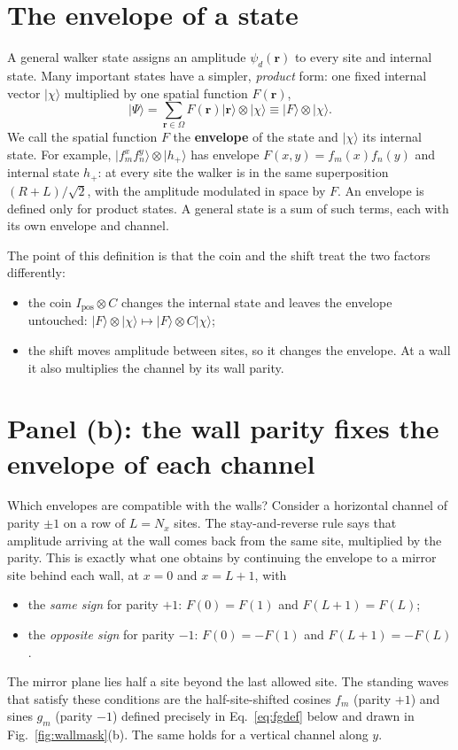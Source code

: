 \documentclass[11pt,a4paper,oneside]{report}
\newcommand{\ket}[1]{\lvert #1\rangle}
\newcommand{\Id}{I}
\numberwithin{equation}{chapter}
\begin{document}
\section{The envelope of a state}
\label{sec:envelopedef}

A general walker state assigns an amplitude \(\psi_d(\mathbf r)\) to every
site and internal state. Many important states have a simpler,
\emph{product} form: one fixed internal vector \(\ket\chi\) multiplied
by one spatial function \(F(\mathbf r)\),
\begin{equation}
\ket\Psi=\sum_{\mathbf r\in\Omega}F(\mathbf r)\ket{\mathbf r}\otimes
\ket\chi\equiv\ket F\otimes\ket\chi .
\end{equation}
We call the spatial function \(F\) the \textbf{envelope} of the state and
\(\ket\chi\) its internal state. For example,
\(\ket{f_m^xf_n^y}\otimes\ket{h_+}\) has envelope
\(F(x,y)=f_m(x)f_n(y)\) and internal state \(h_+\): at every site the
walker is in the same superposition \((R+L)/\sqrt2\), with the amplitude
modulated in space by \(F\). An envelope is defined only for product
states. A general state is a sum of such terms, each with its own
envelope and channel.

The point of this definition is that the coin and the shift treat the two
factors differently:
\begin{itemize}
\item the coin \(\Id_{\mathrm{pos}}\otimes C\) changes the internal state
and leaves the envelope untouched:
\(\ket F\otimes\ket\chi\mapsto\ket F\otimes C\ket\chi\);
\item the shift moves amplitude between sites, so it changes the
envelope. At a wall it also multiplies the channel by its wall parity.
\end{itemize}

\section{Panel (b): the wall parity fixes the envelope of each channel}
\label{sec:panelb}

Which envelopes are compatible with the walls? Consider a horizontal
channel of parity \(\pm1\) on a row of \(L=N_x\) sites. The
stay-and-reverse rule says that amplitude arriving at the wall comes back
from the same site, multiplied by the parity. This is exactly what one
obtains by continuing the envelope to a mirror site behind each wall, at
\(x=0\) and \(x=L+1\), with
\begin{itemize}
\item the \emph{same sign} for parity \(+1\): \(F(0)=F(1)\) and
\(F(L+1)=F(L)\);
\item the \emph{opposite sign} for parity \(-1\): \(F(0)=-F(1)\) and
\(F(L+1)=-F(L)\).
\end{itemize}
The mirror plane lies half a site beyond the last allowed site. The
standing waves that satisfy these conditions are the half-site-shifted
cosines \(f_m\) (parity \(+1\)) and sines \(g_m\) (parity \(-1\)) defined
precisely in Eq.~\eqref{eq:fgdef} below and drawn in
Fig.~\ref{fig:wallmask}(b). The same holds for a vertical channel along
\(y\).
\end{document}
